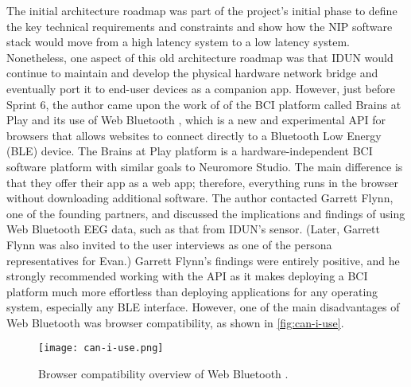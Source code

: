 The initial architecture roadmap was part of the project’s initial phase to define the key technical requirements and constraints and show how the NIP software stack would move from a high latency system to a low latency system. Nonetheless, one aspect of this old architecture roadmap was that IDUN would continue to maintain and develop the physical hardware network bridge and eventually port it to end-user devices as a companion app. However, just before Sprint 6, the author came upon the work of \citeauthor{flynn_brainsplay_nodate} of the BCI platform called Brains at Play and its use of Web Bluetooth \citep{brainsplay_add_nodate}, which is a new and experimental API for browsers that allows websites to connect directly to a Bluetooth Low Energy (BLE) device. The Brains at Play platform is a hardware-independent BCI software platform with similar goals to Neuromore Studio. The main difference is that they offer their app as a web app; therefore, everything runs in the browser without downloading additional software. The author contacted Garrett Flynn, one of the founding partners, and discussed the implications and findings of using Web Bluetooth EEG data, such as that from IDUN’s sensor. (Later, Garrett Flynn was also invited to the user interviews as one of the persona representatives for Evan.) Garrett Flynn’s findings were entirely positive, and he strongly recommended working with the API as it makes deploying a BCI platform much more effortless than deploying applications for any operating system, especially any BLE interface. However, one of the main disadvantages of Web Bluetooth was browser compatibility, as shown in \autoref{fig:can-i-use}.

\begin{figure}[!ht]
  \centering
  \texttt{[image: can-i-use.png]}
  \caption[Browser compatibility overview of Web Bluetooth]{Browser compatibility overview of Web Bluetooth \citep{caniuse_web_nodate}.}
  \label{fig:can-i-use}
\end{figure}

